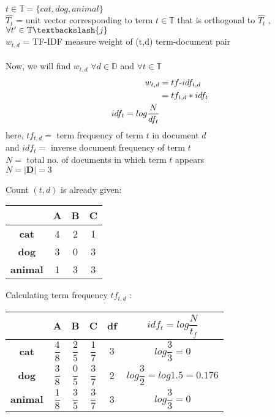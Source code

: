 \documentclass[11pt]{exam}
\newcommand\tab[1][1cm]{\hspace*{#1}}
\begin{document}
\begin{questions}
\begin{solution}
    $t\in \mathbb{T} = \{cat, dog, animal\}$\\
    $\hat{T_t}$ = unit vector corresponding to term $t \in \mathbb{T}$ that is orthogonal to $\hat{T_t}$ , $\forall t' \in \mathbb{T} \textbackslash \{j\}$\\
    $w_{t,d}$ = TF-IDF measure weight of (t,d) term-document pair\\\\
    Now, we will find $w_{t,d}$ \tab $\forall d \in \mathbb{D}$ and $\forall t \in \mathbb{T}$\\
    \begin{align*}
        w_{t,d} &= tf{\text -}idf_{t,d}\\
        &= tf_{t,d} * idf_t\\
        idf_t = log{\frac{N}{df_t}}
    \end{align*}
    here, $tf_{t,d} =$ term frequency of term $t$ in document $d$\\
    and $idf_t = $ inverse document frequency of term $t$\\
    $N = $ total no. of documents in which term $t$ appears\\
    $N = |\textbf{D}| = 3$
    
    Count $(t,d)$ is already given:\\
    \begin{center}
    \begin{tabular}{ |c||c|c|c| } 
     \hline
     &\textbf{A} & \textbf{B} & \textbf{C} \\ 
     \hline\hline
     \textbf{cat}& 4 & 2 & 1 \\[1em]
     \hline
     \textbf{dog}& 3 & 0 & 3 \\[1em] 
     \hline
     \textbf{animal}& 1 & 3 & 3 \\[1em] 
     \hline
    \end{tabular}
    \end{center}
    
    Calculating term frequency $tf_{t,d}$ :
    \begin{center}
    \begin{tabular}{ |c||c|c|c|c|c| } 
     \hline
     &\textbf{A} & \textbf{B} & \textbf{C} & \textbf{df} & \textbf{$idf_t = log\dfrac{N}{t_f}$}\\[1em]
     \hline\hline
     \textbf{cat}& $\dfrac{4}{8}$ & $\dfrac{2}{5}$ & $\dfrac{1}{7}$ & $3$ & $log\dfrac{3}{3} = 0$\\[1em]
     \hline
     \textbf{dog}& $\dfrac{3}{8}$ & $\dfrac{0}{5}$ & $\dfrac{3}{7}$ & 2 & $log\dfrac{3}{2}=log1.5 = 0.176$\\[1em]
     \hline
     \textbf{animal}& $\dfrac{1}{8}$ & $\dfrac{3}{5}$ & $\dfrac{3}{7}$ & 3 & $log\dfrac{3}{3} = 0$\\[1em]
     \hline
    \end{tabular}
    \end{center}
    

\end{solution}
\end{questions}
\end{document}
